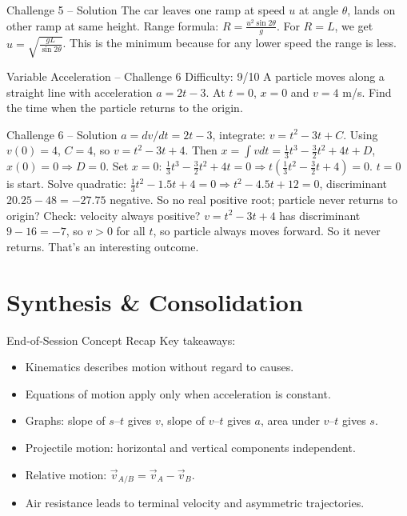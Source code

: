 \documentclass{beamer}
\begin{document}
\begin{frame}[shrink=15]{Challenge 5 – Solution}
The car leaves one ramp at speed $u$ at angle $\theta$, lands on other ramp at same height. Range formula: $R = \frac{u^2 \sin 2\theta}{g}$. For $R = L$, we get $u = \sqrt{\frac{gL}{\sin 2\theta}}$. This is the minimum because for any lower speed the range is less.
\end{frame}

\begin{frame}[t,shrink=15]{Variable Acceleration – Challenge 6 \hfill Difficulty: 9/10}
A particle moves along a straight line with acceleration $a = 2t - 3$. At $t=0$, $x=0$ and $v=4$ m/s. Find the time when the particle returns to the origin.
\end{frame}

\begin{frame}[shrink=15]{Challenge 6 – Solution}
$a = dv/dt = 2t-3$, integrate: $v = t^2 - 3t + C$. Using $v(0)=4$, $C=4$, so $v = t^2 -3t +4$.
Then $x = \int v dt = \frac13 t^3 - \frac32 t^2 + 4t + D$, $x(0)=0 \Rightarrow D=0$.
Set $x=0$: $\frac13 t^3 - \frac32 t^2 + 4t = 0 \Rightarrow t(\frac13 t^2 - \frac32 t + 4) = 0$. $t=0$ is start. Solve quadratic: $\frac13 t^2 - 1.5 t + 4 = 0 \Rightarrow t^2 - 4.5 t + 12 = 0$, discriminant $20.25 - 48 = -27.75$ negative. So no real positive root; particle never returns to origin? Check: velocity always positive? $v = t^2 -3t+4$ has discriminant $9-16=-7$, so $v>0$ for all $t$, so particle always moves forward. So it never returns. That's an interesting outcome.
\end{frame}

\section{Synthesis \& Consolidation}

\begin{frame}{End‑of‑Session Concept Recap}
Key takeaways:
\begin{itemize}
    \item Kinematics describes motion without regard to causes.
    \item Equations of motion apply only when acceleration is constant.
    \item Graphs: slope of $s$–$t$ gives $v$, slope of $v$–$t$ gives $a$, area under $v$–$t$ gives $s$.
    \item Projectile motion: horizontal and vertical components independent.
    \item Relative motion: $\vec{v}_{A/B} = \vec{v}_A - \vec{v}_B$.
    \item Air resistance leads to terminal velocity and asymmetric trajectories.
\end{itemize}
\end{frame}
\end{document}

